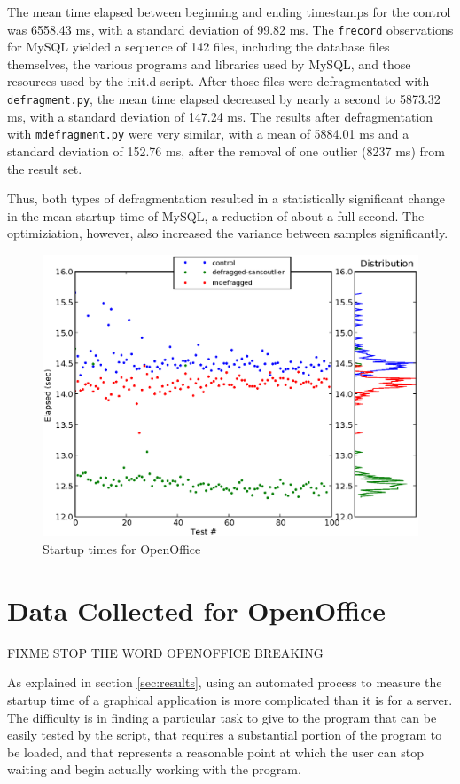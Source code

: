 \documentclass[10pt,twocolumn,letterpaper]{article}
\begin{document}
The mean time elapsed between beginning and ending timestamps for the control was 6558.43 ms, with a standard deviation of 99.82 ms. The \texttt{frecord} observations for MySQL yielded a sequence of 142 files, including the database files themselves, the various programs and libraries used by MySQL, and those resources used by the init.d script. After those files were defragmentated with \texttt{defragment.py}, the mean time elapsed decreased by nearly a second to 5873.32 ms, with a standard deviation of 147.24 ms. The results after defragmentation with \texttt{mdefragment.py} were very similar, with a mean of 5884.01 ms and a standard deviation of 152.76 ms, after the removal of one outlier (8237 ms) from the result set.

Thus, both types of defragmentation resulted in a statistically significant change in the mean startup time of MySQL, a reduction of about a full second. The optimiziation, however, also increased the variance between samples significantly.

\begin{figure}[!htb]
\includegraphics[scale=0.75]{openoffice-chart.eps}
\caption{Startup times for OpenOffice}
\label{oochart}
\end{figure}

\section{Data Collected for OpenOffice}

FIXME STOP THE WORD OPENOFFICE BREAKING

As explained in section \ref{sec:results}, using an automated process to measure the startup time of a graphical application is more complicated than it is for a server. The difficulty is in finding a particular task to give to the program that can be easily tested by the script, that requires a substantial portion of the program to be loaded, and that represents a reasonable point at which the user can stop waiting and begin actually working with the program.
\end{document}
